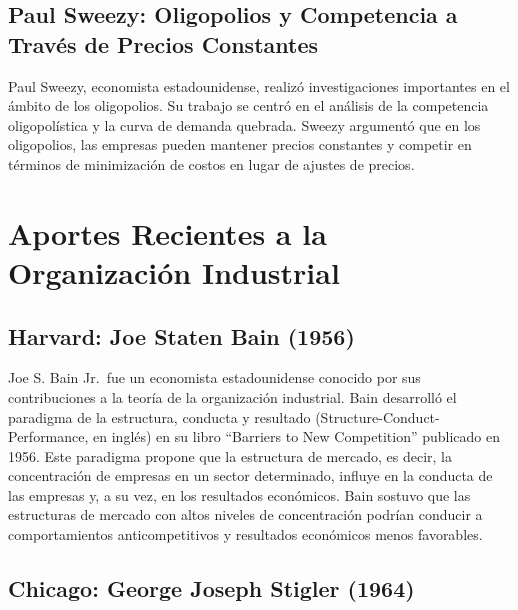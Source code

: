 \documentclass[
  a4paper,
]{article}
\begin{document}
\hypertarget{paul-sweezy-oligopolios-y-competencia-a-travuxe9s-de-precios-constantes}{%
\subsection{Paul Sweezy: Oligopolios y Competencia a Través de Precios
Constantes}\label{paul-sweezy-oligopolios-y-competencia-a-travuxe9s-de-precios-constantes}}

Paul Sweezy, economista estadounidense, realizó investigaciones
importantes en el ámbito de los oligopolios. Su trabajo se centró en el
análisis de la competencia oligopolística y la curva de demanda
quebrada. Sweezy argumentó que en los oligopolios, las empresas pueden
mantener precios constantes y competir en términos de minimización de
costos en lugar de ajustes de precios.

\hypertarget{aportes-recientes-a-la-organizaciuxf3n-industrial}{%
\section{Aportes Recientes a la Organización
Industrial}\label{aportes-recientes-a-la-organizaciuxf3n-industrial}}

\hypertarget{harvard-joe-staten-bain-1956}{%
\subsection{Harvard: Joe Staten Bain
(1956)}\label{harvard-joe-staten-bain-1956}}

Joe S. Bain Jr.~fue un economista estadounidense conocido por sus
contribuciones a la teoría de la organización industrial. Bain
desarrolló el paradigma de la estructura, conducta y resultado
(Structure-Conduct-Performance, en inglés) en su libro ``Barriers to New
Competition'' publicado en 1956. Este paradigma propone que la
estructura de mercado, es decir, la concentración de empresas en un
sector determinado, influye en la conducta de las empresas y, a su vez,
en los resultados económicos. Bain sostuvo que las estructuras de
mercado con altos niveles de concentración podrían conducir a
comportamientos anticompetitivos y resultados económicos menos
favorables.

\hypertarget{chicago-george-joseph-stigler-1964}{%
\subsection{Chicago: George Joseph Stigler
(1964)}\label{chicago-george-joseph-stigler-1964}}
\end{document}
